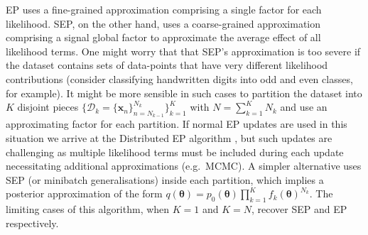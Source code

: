 EP uses a fine-grained approximation comprising a single factor for each likelihood. SEP, on the other hand, uses a coarse-grained approximation comprising a signal global factor to approximate the average effect of all likelihood terms. One might worry that that SEP's approximation is too severe if the dataset contains sets of data-points that have very different likelihood contributions (consider classifying handwritten digits into odd and even classes, for example). It might be more sensible in such cases to partition the dataset into $K$ disjoint pieces $\{ \mathcal{D}_k = \{\bm{x}_n\}_{n=N_{k-1}}^{N_k} \}_{k=1}^{K}$ with $N = \sum_{k=1}^K N_k$ and use an approximating factor for each partition. If normal EP updates are used in this situation we arrive at the Distributed EP algorithm \cite{gelman:dep}\cite{xu:sms}, but such updates are challenging as multiple likelihood terms must be included during each update necessitating additional approximations (e.g.~MCMC). A simpler alternative uses SEP (or minibatch generalisations) inside each partition, which implies a posterior approximation of the form $q(\bm{\theta}) = p_0(\bm{\theta}) \prod_{k=1}^K f_{k}(\bm{\theta})^{N_k}$. The limiting cases of this algorithm, when $K=1$ and $K=N$, recover SEP and EP respectively. 


%
%


